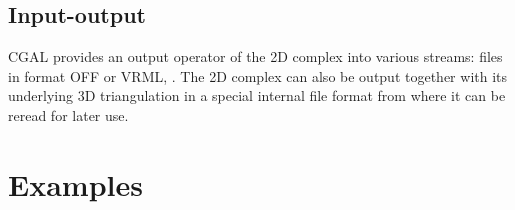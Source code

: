 \subsection{Input-output}
CGAL provides an  output operator of the
2D complex into  various streams:
files in format  OFF or VRML, .
The 2D complex can also be output together with its underlying 3D triangulation
in a special internal file format from where it can be reread for later use.



\section{Examples}
\label{section_C2inT3_Examples}






